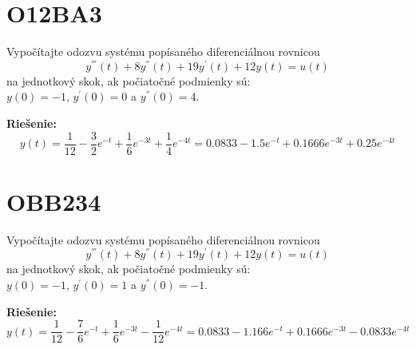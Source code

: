 \documentclass[a4paper, 12pt]{article}
\newenvironment{task}{}{}
\newenvironment{solution}{\noindent\textbf{Riešenie:}}{}
\begin{document}
\section*{O12BA3}
\begin{task}
    Vypočítajte odozvu systému popísaného diferenciálnou rovnicou 
    \begin{equation*}
        y^{'''}(t)+8y^{''}(t)+19y^{'}(t)+12y(t)=u(t)
    \end{equation*}
    na jednotkový skok, ak počiatočné podmienky sú: \\
    $y(0)=-1$, $y^{'}(0)=0$ a $y^{''}(0)=4$.    
\end{task} 

\begin{solution}
    \begin{equation*}
        y(t)=\dfrac{1}{12} - \dfrac{3}{2}e^{-t} + \dfrac{1}{6}e^{-3t} + \dfrac{1}{4}e^{-4t} = 0.0833 -1.5 e^{-t} + 0.1666 e^{-3t} + 0.25 e^{-4t}
    \end{equation*}
\end{solution}


\section*{OBB234}
\begin{task}
    Vypočítajte odozvu systému popísaného diferenciálnou rovnicou 
    \begin{equation*}
        y^{'''}(t)+8y^{''}(t)+19y^{'}(t)+12y(t)=u(t)
    \end{equation*}
    na jednotkový skok, ak počiatočné podmienky sú: \\
    $y(0)=-1$, $y^{'}(0)=1$ a $y^{''}(0)=-1$.    
\end{task} 

\begin{solution}
    \begin{equation*}
        y(t)=\dfrac{1}{12} - \dfrac{7}{6}e^{-t} + \dfrac{1}{6}e^{-3t} - \dfrac{1}{12}e^{-4t} = 0.0833 -1.166 e^{-t} + 0.1666 e^{-3t} - 0.0833 e^{-4t}
    \end{equation*}
\end{solution}
\end{document}
